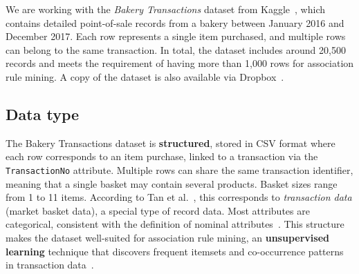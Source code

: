 \label{chap:data-understanding}

We are working with the \textit{Bakery Transactions} dataset from Kaggle~\cite{bakerydata}, 
which contains detailed point-of-sale records from a bakery between January 2016 and December 2017. 
Each row represents a single item purchased, and multiple rows can belong to the same transaction.  
In total, the dataset includes around 20,500 records and meets the requirement of having more than 
1,000 rows for association rule mining.
A copy of the dataset is also available via Dropbox~\cite{csvdataset}.  

\subsection*{Data type}
The Bakery Transactions dataset is \textbf{structured}, 
stored in CSV format where each row corresponds to an item purchase, 
linked to a transaction via the \texttt{TransactionNo} attribute.  
Multiple rows can share the same transaction identifier, meaning that a single 
basket may contain several products.  
Basket sizes range from 1 to 11 items. 
According to Tan et al.~\cite[Ch.~2, Sec.~2.1.2]{courseLitt}, 
this corresponds to \textit{transaction data} (market basket data), 
a special type of record data.  
Most attributes are categorical, consistent with the definition of nominal 
attributes~\cite[Ch.~2, Sec.~2.1.1]{courseLitt}.  
This structure makes the dataset well-suited for association rule mining, 
an \textbf{unsupervised learning} technique that discovers frequent itemsets 
and co-occurrence patterns in transaction data~\cite[Ch.~5, Sec.~5.1]{courseLitt}.



